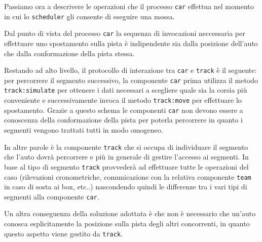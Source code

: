 Passiamo ora a descrivere le operazioni che il processo \texttt{car} effettua nel momento in cui lo \texttt{scheduler} gli consente di eseguire una mossa.

Dal punto di vista del processo \texttt{car} la sequenza di invocazioni neccessaria per effettuare uno spostamento sulla pista è indipendente sia dalla posizione dell'auto che dalla conformazione della pista stessa.

Restando ad alto livello, il protocollo di interazione tra \texttt{car} e \texttt{track} è il seguente: per percorrere il segmento successivo, la componente \texttt{car} prima utilizza il metodo \texttt{track:simulate} per ottenere i dati necessari a scegliere quale sia la corsia più conveniente e successivamente invoca il metodo \texttt{track:move} per effettuare lo spostamento.
Grazie a questo schema le componenti \texttt{car} non devono essere a conoscenza della conformazione della pista per poterla percorrere in quanto i segmenti vengono trattati tutti in modo omogeneo.

In altre parole è la componente \texttt{track} che si occupa di individuare il segmento che l'auto dovrà percorrere e più in generale di gestire l'accesso ai segmenti. In base al tipo di segmento \texttt{track} provvederà ad effettuare tutte le operazioni del caso (rilevazioni cronometriche, comunicazione con la relativa componente \texttt{team} in caso di sosta ai box, etc..) nascondendo quindi le differenze tra i vari tipi di segmenti alla componente \texttt{car}.

Un altra conseguenza della soluzione adottata è che non è necessario che un'auto conosca esplicitamente la posizione sulla pista degli altri concorrenti, in quanto questo aspetto viene gestito da \texttt{track}.


